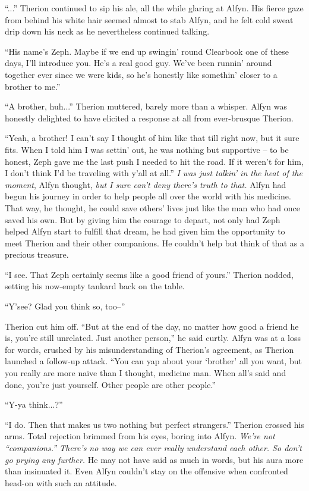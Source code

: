 ``...'' Therion continued to sip his ale, all the while glaring at Alfyn. His fierce gaze from behind his white hair seemed almost to stab Alfyn, and he felt cold sweat drip down his neck as he nevertheless continued talking.

``His name's Zeph. Maybe if we end up swingin' round Clearbook one of these days, I'll introduce you. He's a real good guy. We've been runnin' around together ever since we were kids, so he's honestly like somethin' closer to a brother to me.''

``A brother, huh...'' Therion muttered, barely more than a whisper. Alfyn was honestly delighted to have elicited a response at all from ever-brusque Therion.

``Yeah, a brother! I can't say I thought of him like that till right now, but it sure fits. When I told him I was settin' out, he was nothing but supportive -- to be honest, Zeph gave me the last push I needed to hit the road. If it weren't for him, I don't think I'd be traveling with y'all at all.'' \emph{I was just talkin' in the heat of the moment}, Alfyn thought, \emph{but I sure can't deny there's truth to that.} Alfyn had begun his journey in order to help people all over the world with his medicine. That way, he thought, he could save others' lives just like the man who had once saved his own. But by giving him the courage to depart, not only had Zeph helped Alfyn start to fulfill that dream, he had given him the opportunity to meet Therion and their other companions. He couldn't help but think of that as a precious treasure.

``I see. That Zeph certainly seems like a good friend of yours.'' Therion nodded, setting his now-empty tankard back on the table.

``Y'see? Glad you think so, too--''

Therion cut him off. ``But at the end of the day, no matter how good a friend he is, you're still unrelated. Just another person,'' he said curtly. Alfyn was at a loss for words, crushed by his misunderstanding of Therion's agreement, as Therion launched a follow-up attack. ``You can yap about your `brother' all you want, but you really are more naïve than I thought, medicine man. When all's said and done, you're just yourself. Other people are other people.''

``Y-ya think...?''

``I do. Then that makes us two nothing but perfect strangers.'' Therion crossed his arms. Total rejection brimmed from his eyes, boring into Alfyn. \emph{We're not ``companions.'' There's no way we can ever really understand each other. So don't go prying any further.} He may not have said as much in words, but his aura more than insinuated it. Even Alfyn couldn't stay on the offensive when confronted head-on with such an attitude. 


